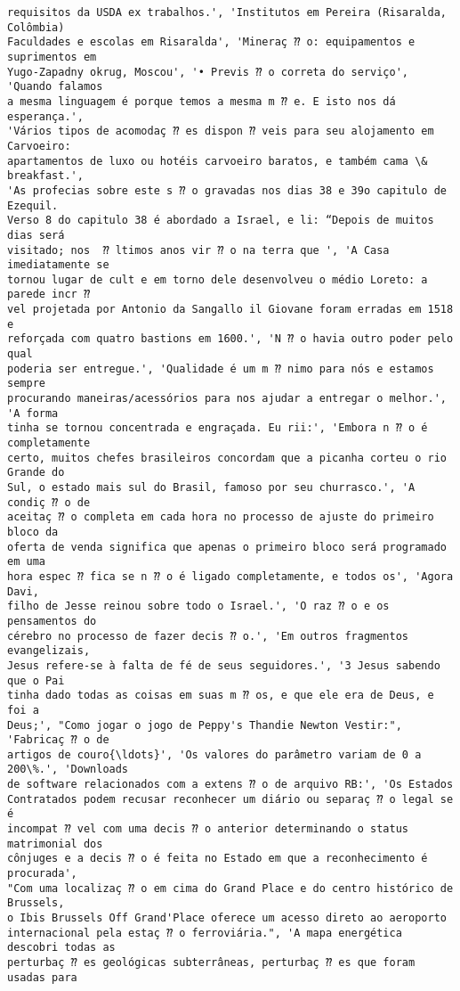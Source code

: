 \documentclass[10pt]{article}
\begin{document}
\begin{Verbatim}[commandchars=\\\{\}]
requisitos da USDA ex trabalhos.', 'Institutos em Pereira (Risaralda, Colômbia)
Faculdades e escolas em Risaralda', 'Mineraç ⁇ o: equipamentos e suprimentos em
Yugo-Zapadny okrug, Moscou', '• Previs ⁇ o correta do serviço', 'Quando falamos
a mesma linguagem é porque temos a mesma m ⁇ e. E isto nos dá esperança.',
'Vários tipos de acomodaç ⁇ es dispon ⁇ veis para seu alojamento em Carvoeiro:
apartamentos de luxo ou hotéis carvoeiro baratos, e também cama \& breakfast.',
'As profecias sobre este s ⁇ o gravadas nos dias 38 e 39o capitulo de Ezequil.
Verso 8 do capitulo 38 é abordado a Israel, e li: “Depois de muitos dias será
visitado; nos  ⁇ ltimos anos vir ⁇ o na terra que ', 'A Casa imediatamente se
tornou lugar de cult e em torno dele desenvolveu o médio Loreto: a parede incr ⁇
vel projetada por Antonio da Sangallo il Giovane foram erradas em 1518 e
reforçada com quatro bastions em 1600.', 'N ⁇ o havia outro poder pelo qual
poderia ser entregue.', 'Qualidade é um m ⁇ nimo para nós e estamos sempre
procurando maneiras/acessórios para nos ajudar a entregar o melhor.', 'A forma
tinha se tornou concentrada e engraçada. Eu rii:', 'Embora n ⁇ o é completamente
certo, muitos chefes brasileiros concordam que a picanha corteu o rio Grande do
Sul, o estado mais sul do Brasil, famoso por seu churrasco.', 'A condiç ⁇ o de
aceitaç ⁇ o completa em cada hora no processo de ajuste do primeiro bloco da
oferta de venda significa que apenas o primeiro bloco será programado em uma
hora espec ⁇ fica se n ⁇ o é ligado completamente, e todos os', 'Agora Davi,
filho de Jesse reinou sobre todo o Israel.', 'O raz ⁇ o e os pensamentos do
cérebro no processo de fazer decis ⁇ o.', 'Em outros fragmentos evangelizais,
Jesus refere-se à falta de fé de seus seguidores.', '3 Jesus sabendo que o Pai
tinha dado todas as coisas em suas m ⁇ os, e que ele era de Deus, e foi a
Deus;', "Como jogar o jogo de Peppy's Thandie Newton Vestir:", 'Fabricaç ⁇ o de
artigos de couro{\ldots}', 'Os valores do parâmetro variam de 0 a 200\%.', 'Downloads
de software relacionados com a extens ⁇ o de arquivo RB:', 'Os Estados
Contratados podem recusar reconhecer um diário ou separaç ⁇ o legal se é
incompat ⁇ vel com uma decis ⁇ o anterior determinando o status matrimonial dos
cônjuges e a decis ⁇ o é feita no Estado em que a reconhecimento é procurada',
"Com uma localizaç ⁇ o em cima do Grand Place e do centro histórico de Brussels,
o Ibis Brussels Off Grand'Place oferece um acesso direto ao aeroporto
internacional pela estaç ⁇ o ferroviária.", 'A mapa energética descobri todas as
perturbaç ⁇ es geológicas subterrâneas, perturbaç ⁇ es que foram usadas para

\end{Verbatim}
\end{document}
